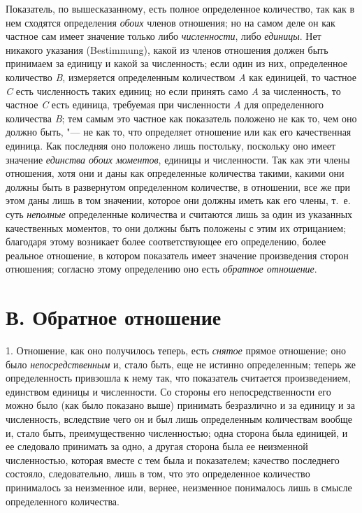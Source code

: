 Показатель, по вышесказанному, есть полное определенное количество, так как
в нем сходятся определения {\em обоих} членов
отношения; но на самом деле он как частное сам имеет значение только либо
{\em численности}, либо
{\em единицы}. Нет никакого указания (Bestimmung),
какой из членов отношения должен быть принимаем за единицу и какой за
численность; если один из них, определенное количество
{\em B}, измеряется определенным количеством
{\em A} как единицей, то частное
{\em C} есть численность таких единиц; но если принять
само {\em A} за численность, то частное
{\em C} есть единица, требуемая при численности
{\em A} для определенного количества
{\em B}; тем самым это частное как показатель положено
не как то, чем оно должно быть, "--- не как то, что определяет отношение или
как его качественная единица. Как последняя оно положено лишь постольку,
поскольку оно имеет значение {\em единства обоих
моментов}, единицы и численности. Так как эти члены отношения, хотя они и
даны как определенные количества такими, какими они должны быть в
развернутом определенном количестве, в отношении, все же при этом даны лишь
в том значении, которое они должны иметь как его члены, т.~е. суть
{\em неполные} определенные количества и считаются лишь
за один из указанных качественных моментов, то они должны быть положены с
этим их отрицанием; благодаря этому возникает более соответствующее его
определению, более реальное отношение, в котором показатель имеет значение
произведения сторон отношения; согласно этому определению оно есть
{\em обратное отношение}.

\section[В. Обратное отношение]{В. Обратное отношение}
1. Отношение, как оно получилось теперь, есть
{\em снятое} прямое отношение; оно было
{\em непосредственным} и, стало быть, еще не истинно
определенным; теперь же определенность привзошла к нему так, что показатель
считается произведением, единством единицы и численности. Со стороны его
непосредственности его можно было (как было показано выше) принимать
безразлично и за единицу и за численность, вследствие чего он и был лишь
определенным количествам вообще и, стало быть, преимущественно
численностью; одна сторона была единицей, и ее следовало принимать за одно,
а другая сторона была ее неизменной численностью, которая вместе с тем была
и показателем; качество последнего состояло, следовательно, лишь в том, что
это определенное количество принималось за неизменное или, вернее,
неизменное понималось лишь в смысле определенного количества.

